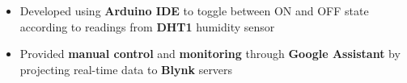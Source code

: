 \documentclass[10pt,a4paper,sans]{moderncv}        %
\newcommand{\lhsmall}[1]{{\small{\textit{#1}}}}
\newcommand{\rhsmall}[1]{\hfill{\footnotesize{\textsl{(#1)}}}}
\newcommand{\rhsmalle}[1]{\hfill{\footnotesize{\textsl{(#1)}}}\\[-12pt]}
\newcommand{\CFont}{\fontsize{11}{13.2}\selectfont}
\newcommand{\head}[1]{{\CFont{\textbf{#1}}}}
\begin{document}
\begin{itemize}
	\item Developed using \textbf{Arduino IDE} to toggle between ON and OFF state according to readings from \textbf{DHT1} humidity sensor
	\item Provided \textbf{manual control} and \textbf{monitoring} through \textbf{Google Assistant} by projecting real-time data to \textbf{Blynk} servers%
\end{itemize}
\end{document}
